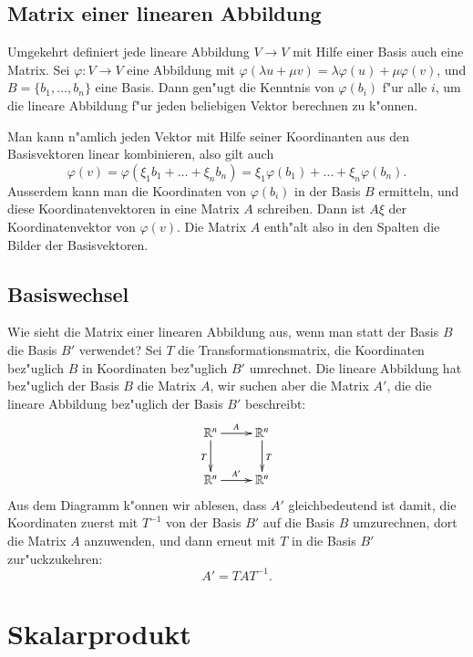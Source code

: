 \subsection{Matrix einer linearen Abbildung}
Umgekehrt definiert jede lineare Abbildung $V\to V$ mit Hilfe einer
Basis auch eine Matrix. Sei $\varphi\colon V\to V$ eine Abbildung
mit $\varphi(\lambda u+\mu v)=\lambda \varphi(u)+\mu\varphi(v)$,
und $B=\{b_1,\dots,b_n\}$ eine Basis. Dann gen"ugt die Kenntnis
von $\varphi(b_i)$ f"ur alle $i$, um die lineare Abbildung f"ur
jeden beliebigen Vektor berechnen zu k"onnen.

Man kann n"amlich jeden Vektor mit Hilfe seiner Koordinanten aus
den Basisvektoren linear kombinieren, also gilt auch
\[
\varphi(v)
=
\varphi(\xi_1b_1+\dots+\xi_nb_n)
=
\xi_1\varphi(b_1)+\dots+\xi_n\varphi(b_n).
\]
Ausserdem kann man die Koordinaten von $\varphi(b_i)$ in der Basis
$B$ ermitteln, und diese Koordinatenvektoren in eine Matrix $A$
schreiben. Dann ist $A\xi$ der Koordinatenvektor von $\varphi(v)$.
Die Matrix $A$ enth"alt also in den Spalten die Bilder der Basisvektoren.

\subsection{Basiswechsel}
Wie sieht die Matrix einer linearen Abbildung aus, wenn man statt
der Basis $B$ die Basis $B'$ verwendet? Sei $T$ die Transformationsmatrix,
die Koordinaten bez"uglich $B$ in Koordinaten bez"uglich $B'$ umrechnet.
Die lineare Abbildung hat bez"uglich der Basis $B$ die Matrix $A$, wir
suchen aber die Matrix $A'$, die die lineare Abbildung bez"uglich der
Basis $B'$ beschreibt:
\[
\xymatrix{
\mathbb R^n\ar[r]^{A} \ar[d]_{T}
	&\mathbb R^n \ar[d]^{T}
\\
\mathbb R^n\ar[r]^{A'}
	&\mathbb R^n
}
\]
Aus dem Diagramm k"onnen wir ablesen, dass $A'$ gleichbedeutend
ist damit, die Koordinaten zuerst mit $T^{-1}$ von der Basis $B'$
auf die Basis $B$ umzurechnen, dort die Matrix $A$ anzuwenden, und
dann erneut mit $T$ in die Basis $B'$ zur"uckzukehren:
\[
A'=TAT^{-1}.
\]

\section{Skalarprodukt}
